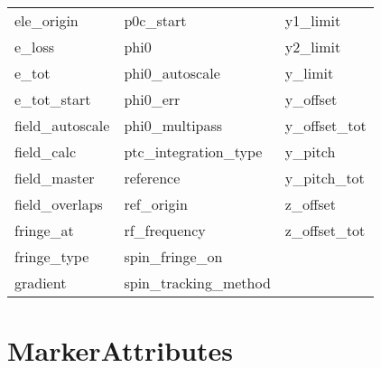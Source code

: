 \begin{tabular}{lll}
ele_origin                  & p0c_start                   & y1_limit                    \\
e_loss                      & phi0                        & y2_limit                    \\
e_tot                       & phi0_autoscale              & y_limit                     \\
e_tot_start                 & phi0_err                    & y_offset                    \\
field_autoscale             & phi0_multipass              & y_offset_tot                \\
field_calc                  & ptc_integration_type        & y_pitch                     \\
field_master                & reference                   & y_pitch_tot                 \\
field_overlaps              & ref_origin                  & z_offset                    \\
fringe_at                   & rf_frequency                & z_offset_tot                \\
fringe_type                 & spin_fringe_on              &                             \\
gradient                    & spin_tracking_method        &                             \\
 \bottomrule
 \end{tabular}
 \vfill
 
 \section{MarkerAttributes}
 \label{s:list.marker}
 
